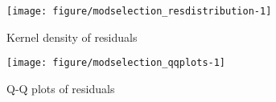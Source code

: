\documentclass[12pt,a4paper]{article}\usepackage[]{graphicx}\usepackage[]{color}
\newenvironment{knitrout}{}{} %
\begin{document}
\begin{knitrout}
\color{fgcolor}\begin{figure}[htbp]

{\centering \texttt{[image: figure/modselection\_resdistribution-1]} 

}

\caption[Kernel density of residuals]{Kernel density of residuals}\label{fig:modselection_resdistribution}
\end{figure}


\end{knitrout}

\begin{knitrout}
\color{fgcolor}\begin{figure}[htbp]

{\centering \texttt{[image: figure/modselection\_qqplots-1]} 

}

\caption[Q-Q plots of residuals]{Q-Q plots of residuals}\label{fig:modselection_qqplots}
\end{figure}


\end{knitrout}









\end{document}
